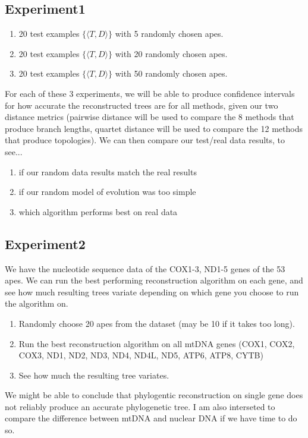 \documentclass[11pt]{article}
\begin{document}
\subsection*{Experiment1}
\begin{enumerate}
  \item 20 test examples $\{\langle T, D \rangle\}$ with 5 randomly chosen apes.
  \item 20 test examples $\{\langle T, D \rangle\}$ with 20 randomly chosen apes.
  \item 20 test examples $\{\langle T, D \rangle\}$ with 50 randomly chosen apes.
\end{enumerate}

For each of these 3 experiments, we will be able to produce confidence intervals for how
accurate the reconstructed trees are for all methods, given our two distance metrics
(pairwise distance will be used to compare the 8 methods that produce branch lengths,
quartet distance will be used to compare the 12 methods that produce topologies). We can
then compare our test/real data results, to see...
\begin{enumerate}
  \item if our random data results match the real results
  \item if our random model of evolution was too simple
  \item which algorithm performs best on real data
\end{enumerate}

\subsection*{Experiment2}
We have the nucleotide sequence data of the COX1-3, ND1-5 genes of the 53 apes. We can run 
the best performing reconstruction algorithm on each gene, and see how much resulting trees 
variate depending  on which gene you choose to run the algorithm on.
\begin{enumerate}
  \item Randomly choose 20 apes from the dataset (may be 10 if it takes too long).
  \item Run the best reconstruction algorithm on all mtDNA genes (COX1, COX2, COX3, ND1, ND2, ND3, ND4, ND4L, ND5, ATP6, ATP8, CYTB)
  \item See how much the resulting tree variates. 
\end{enumerate}

We might be able to conclude that phylogentic reconstruction on single gene does not reliably produce an accurate phylogenetic tree. I am also interseted to compare the difference between mtDNA and nuclear DNA
if we have time to do so. 
\end{document}
